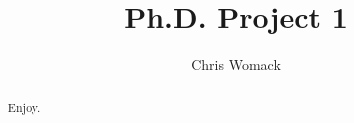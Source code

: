 \documentclass[11pt]{article}
\title{Ph.D. Project 1}
\author{Chris Womack}
\numberwithin{equation}{section}
\begin{document}
\maketitle

\begin{abstract}
Enjoy.
\end{abstract}

\clearpage



\printbibliography
\end{document}
